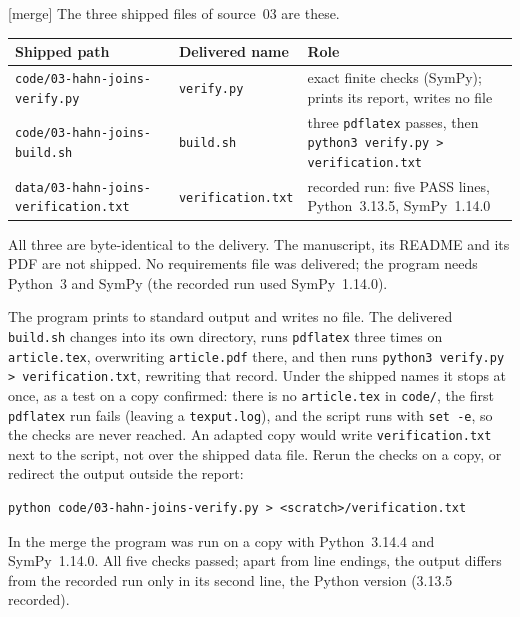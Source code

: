 \documentclass[11pt,letterpaper]{article}
\theoremstyle{definition}
\theoremstyle{remark}
\newcommand{\rpath}[1]{\nolinkurl{#1}}%
\newcommand{\mtag}{\textup{[merge]}}%
\numberwithin{equation}{section}
\begin{document}
\mtag{} The three shipped files of source~03 are these.
\begin{center}\small
\begin{tabular}{@{}>{\raggedright\arraybackslash}p{}>{\raggedright\arraybackslash}p{}>{\raggedright\arraybackslash}p{}@{}}
\toprule
Shipped path & Delivered name & Role\\
\midrule
\rpath{code/03-hahn-joins-verify.py} & \texttt{verify.py} & exact finite
checks (SymPy); prints its report, writes no file\\
\rpath{code/03-hahn-joins-build.sh} & \texttt{build.sh} & three
\texttt{pdflatex} passes, then \texttt{python3 verify.py > verification.txt}\\
\rpath{data/03-hahn-joins-verification.txt} & \texttt{verification.txt} &
recorded run: five PASS lines, Python~3.13.5, SymPy~1.14.0\\
\bottomrule
\end{tabular}
\end{center}
All three are byte-identical to the delivery. The manuscript, its README
and its PDF are not shipped. No requirements file was delivered; the
program needs Python~3 and SymPy (the recorded run used SymPy~1.14.0).

The program prints to standard output and writes no file. The delivered
\texttt{build.sh} changes into its own directory, runs \texttt{pdflatex}
three times on \texttt{article.tex}, overwriting \texttt{article.pdf}
there, and then runs \texttt{python3 verify.py > verification.txt},
rewriting that record. Under the shipped names it stops at once, as a
test on a copy confirmed: there is no \texttt{article.tex} in
\rpath{code/}, the first \texttt{pdflatex} run fails (leaving a
\texttt{texput.log}), and the script runs with \texttt{set -e}, so the
checks are never reached. An adapted copy would write \texttt{verification.txt} next
to the script, not over the shipped data file. Rerun the checks on a copy,
or redirect the output outside the report:
\begin{verbatim}
python code/03-hahn-joins-verify.py > <scratch>/verification.txt
\end{verbatim}
In the merge the program was run on a copy with Python~3.14.4 and
SymPy~1.14.0. All five checks passed; apart from line endings, the output
differs from the recorded run only in its second line, the Python version
(3.13.5 recorded).
\end{document}
